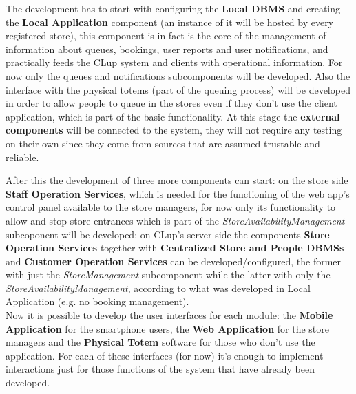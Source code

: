 The development has to start with configuring the \textbf{Local DBMS} and creating the \textbf{Local Application} component (an instance of it will be hosted by every registered store), this component is in fact is the core of the management of information about queues, bookings, user reports and user notifications, and practically feeds the CLup system and clients with operational information. For now only the queues and notifications subcomponents will be developed. Also the interface with the physical totems (part of the queuing process) will be developed in order to allow people to queue in the stores even if they don’t use the client application, which is part of the basic functionality. At this stage the \textbf{external components} will be connected to the system, they will not require any testing on their own since they come from sources that are assumed trustable and reliable.

After this the development of three more components can start: on the store side \textbf{Staff Operation Services}, which is needed for the functioning of the web app’s control panel available to the store managers, for now only its functionality to allow and stop store entrances which is part of the \textit{StoreAvailabilityManagement} subcoponent will be developed; on CLup’s server side the components \textbf{Store Operation Services} together with \textbf{Centralized Store and People DBMSs} and \textbf{Customer Operation Services} can be developed/configured, the former with just the \textit{StoreManagement} subcomponent while the latter with only the \textit{StoreAvailabilityManagement}, according to what was developed in Local Application (e.g. no booking management).\\

Now it is possible to develop the user interfaces for each module: the \textbf{Mobile Application} for the smartphone users, the \textbf{Web Application} for the store managers and the \textbf{Physical Totem} software for those who don’t use the application. For each of these interfaces (for now) it’s enough to implement interactions just for those functions of the system that have already been developed.\\

